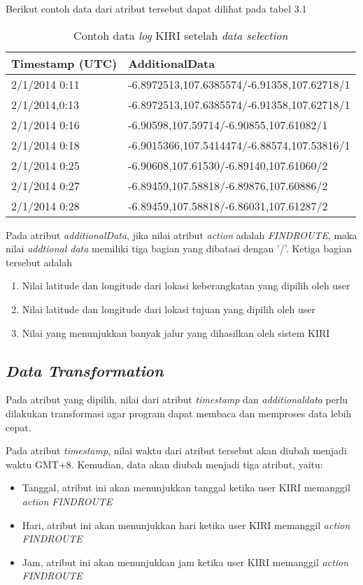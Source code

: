 Berikut contoh data dari atribut tersebut dapat dilihat pada tabel 3.1
\begin{table}[h]
\caption{Contoh data \textsl{log} KIRI setelah \textsl{data selection}}
\begin{tabular}{|l|l|}
\hline
\textbf{Timestamp (UTC)} & \textbf{AdditionalData}                     \\ \hline
2/1/2014 0:11            & -6.8972513,107.6385574/-6.91358,107.62718/1 \\ \hline
2/1/2014,0:13            & -6.8972513,107.6385574/-6.91358,107.62718/1 \\ \hline
2/1/2014 0:16            & -6.90598,107.59714/-6.90855,107.61082/1     \\ \hline
2/1/2014 0:18            & -6.9015366,107.5414474/-6.88574,107.53816/1 \\ \hline
2/1/2014 0:25            & -6.90608,107.61530/-6.89140,107.61060/2     \\ \hline
2/1/2014 0:27            & -6.89459,107.58818/-6.89876,107.60886/2     \\ \hline
2/1/2014 0:28            & -6.89459,107.58818/-6.86031,107.61287/2     \\ \hline
\end{tabular}
\end{table}

Pada atribut \textsl{additionalData}, jika nilai atribut \textsl{action} adalah \textsl{FINDROUTE}, maka nilai \textsl{addtional data} memiliki tiga bagian yang dibatasi dengan '/'. Ketiga bagian tersebut adalah

\begin{enumerate}
	\item Nilai latitude dan longitude dari lokasi keberangkatan yang dipilih oleh user
	\item Nilai latitude dan longitude dari lokasi tujuan yang dipilih oleh user
	\item Nilai yang menunjukkan banyak jalur yang dihasilkan oleh sistem KIRI
\end{enumerate}

\subsection{\textsl{Data Transformation}}
Pada atribut yang dipilih, nilai dari atribut \textsl{timestamp} dan \textsl{additionaldata} perlu dilakukan transformasi agar program dapat membaca dan memproses data lebih cepat. 

Pada atribut \textsl{timestamp}, nilai waktu dari atribut tersebut akan diubah menjadi waktu GMT+8. Kemudian, data akan diubah menjadi tiga atribut, yaitu:
\begin{itemize}
	\item Tanggal, atribut ini akan menunjukkan tanggal ketika user KIRI memanggil \textsl{action FINDROUTE}
	\item Hari, atribut ini akan menunjukkan hari ketika user KIRI memanggil \textsl{action FINDROUTE}
	\item Jam, atribut ini akan menunjukkan jam ketika user KIRI memanggil \textsl{action FINDROUTE}
\end{itemize}

